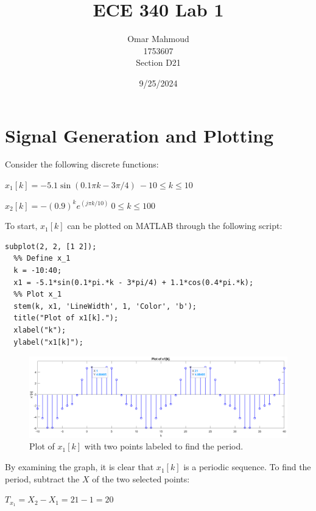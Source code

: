 \documentclass[a4paper, 10pt]{article}
\title{ECE 340 Lab 1}
\author{Omar Mahmoud\\1753607\\Section D21}
\date{9/25/2024}
\begin{document}
\thispagestyle{empty}
\vfill
\maketitle
\vfill

\newpage

\section{Signal Generation and Plotting}

Consider the following discrete functions:
\begin{center}
  $x_1[k] = -5.1\sin(0.1\pi k-3\pi/4)\ -10\leq k\leq 10$\\
\end{center}
\begin{center}
  $x_2[k] = -(0.9)^ke^{(j\pi k/10)}\ 0\leq k\leq 100$
\end{center}

\noindent To start, $x_1[k]$ can be plotted on MATLAB through the following script:
\begin{lstlisting}[style=Matlab-editor, basicstyle=\small\ttfamily]
  subplot(2, 2, [1 2]);
  %% Define x_1
  k = -10:40;
  x1 = -5.1*sin(0.1*pi.*k - 3*pi/4) + 1.1*cos(0.4*pi.*k);
  %% Plot x_1
  stem(k, x1, 'LineWidth', 1, 'Color', 'b');
  title("Plot of x1[k].");
  xlabel("k");
  ylabel("x1[k]");
\end{lstlisting}
\begin{figure}[H]
  \centering
  \includegraphics[width=15cm]{images/x1_plot.png}
  \caption{Plot of $x_1[k]$ with two points labeled to find the period.}
\end{figure}
By examining the graph, it is clear that $x_1[k]$ is a periodic sequence. To find the period, subtract 
the $X$ of the two selected points:
\begin{center}
  $T_{x_1} = X_2-X_1 = 21-1 = 20$ 
\end{center}
\end{document}
